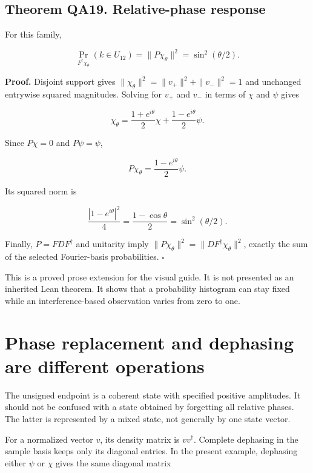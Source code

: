 \hypertarget{q:theorem-qa19.-relative-phase-response}{%
\subsection*{Theorem QA19. Relative-phase
response}\label{q:theorem-qa19.-relative-phase-response}}

For this family,

\[
\boxed{\Pr_{F^\dagger\chi_\theta}(k\in U_{12})
=\|P\chi_\theta\|^2=\sin^2(\theta/2).}
\]

\textbf{Proof.} Disjoint support gives
\(\|\chi_\theta\|^2=\|v_+\|^2+\|v_-\|^2=1\) and unchanged entrywise
squared magnitudes. Solving for \(v_+\) and \(v_-\) in terms of \(\chi\)
and \(\psi\) gives

\[
\chi_\theta
=\frac{1+e^{i\theta}}2\chi
+\frac{1-e^{i\theta}}2\psi.
\]

Since \(P\chi=0\) and \(P\psi=\psi\),

\[
P\chi_\theta=\frac{1-e^{i\theta}}2\psi.
\]

Its squared norm is

\[
\frac{|1-e^{i\theta}|^2}{4}
=\frac{1-\cos\theta}{2}
=\sin^2(\theta/2).
\]

Finally, \(P=FDF^\dagger\) and unitarity imply
\(\|P\chi_\theta\|^2=\|DF^\dagger\chi_\theta\|^2\), exactly the sum of
the selected Fourier-basis probabilities. \(\square\)

This is a proved prose extension for the visual guide. It is not
presented as an inherited Lean theorem. It shows that a probability
histogram can stay fixed while an interference-based observation varies
from zero to one.

\hypertarget{q:phase-replacement-and-dephasing-are-different-operations}{%
\section{Phase replacement and dephasing are different
operations}\label{q:phase-replacement-and-dephasing-are-different-operations}}

The unsigned endpoint is a coherent state with specified positive
amplitudes. It should not be confused with a state obtained by
forgetting all relative phases. The latter is represented by a mixed
state, not generally by one state vector.

For a normalized vector \(v\), its density matrix is \(vv^\dagger\).
Complete dephasing in the sample basis keeps only its diagonal entries.
In the present example, dephasing either \(\psi\) or \(\chi\) gives the
same diagonal matrix

